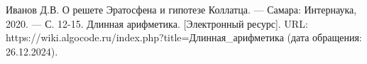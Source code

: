 \begin{thebibliography}{}
	 Иванов Д.В. О решете Эратосфена и гипотезе Коллатца. --- Самара: Интернаука, 2020. --- С. 12-15.
	 Длинная арифметика. [Электронный ресурс]. URL: https://wiki.algocode.ru/index.php?title\-=Длинная\_арифметика
	(дата обращения: 26.12.2024).
\end{thebibliography}
